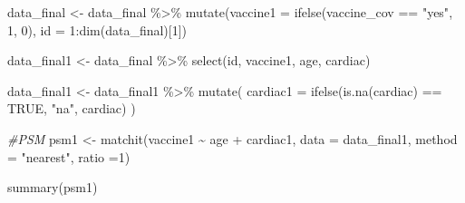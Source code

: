 \documentclass[
]{article}
\newenvironment{Shaded}{\begin{snugshade}}{\end{snugshade}}
\newcommand{\AttributeTok}[1]{\textcolor[rgb]{0.77,0.63,0.00}{#1}}
\newcommand{\CommentTok}[1]{\textcolor[rgb]{0.56,0.35,0.01}{\textit{#1}}}
\newcommand{\ConstantTok}[1]{\textcolor[rgb]{0.00,0.00,0.00}{#1}}
\newcommand{\DecValTok}[1]{\textcolor[rgb]{0.00,0.00,0.81}{#1}}
\newcommand{\FunctionTok}[1]{\textcolor[rgb]{0.00,0.00,0.00}{#1}}
\newcommand{\NormalTok}[1]{#1}
\newcommand{\OtherTok}[1]{\textcolor[rgb]{0.56,0.35,0.01}{#1}}
\newcommand{\SpecialCharTok}[1]{\textcolor[rgb]{0.00,0.00,0.00}{#1}}
\newcommand{\StringTok}[1]{\textcolor[rgb]{0.31,0.60,0.02}{#1}}
\begin{document}
\begin{Shaded}
\begin{Highlighting}[]
\NormalTok{data\_final }\OtherTok{\textless{}{-}}\NormalTok{ data\_final }\SpecialCharTok{\%\textgreater{}\%} 
  \FunctionTok{mutate}\NormalTok{(}\AttributeTok{vaccine1 =} \FunctionTok{ifelse}\NormalTok{(vaccine\_cov }\SpecialCharTok{==} \StringTok{"yes"}\NormalTok{, }\DecValTok{1}\NormalTok{, }\DecValTok{0}\NormalTok{),}
         \AttributeTok{id =} \DecValTok{1}\SpecialCharTok{:}\FunctionTok{dim}\NormalTok{(data\_final)[}\DecValTok{1}\NormalTok{]) }

\NormalTok{data\_final1 }\OtherTok{\textless{}{-}}\NormalTok{ data\_final }\SpecialCharTok{\%\textgreater{}\%} 
  \FunctionTok{select}\NormalTok{(id, vaccine1, age, cardiac)}

\NormalTok{data\_final1 }\OtherTok{\textless{}{-}}\NormalTok{ data\_final1 }\SpecialCharTok{\%\textgreater{}\%} 
  \FunctionTok{mutate}\NormalTok{(}
    \AttributeTok{cardiac1 =} \FunctionTok{ifelse}\NormalTok{(}\FunctionTok{is.na}\NormalTok{(cardiac) }\SpecialCharTok{==} \ConstantTok{TRUE}\NormalTok{, }\StringTok{"na"}\NormalTok{, cardiac)}
\NormalTok{  )}
  
\CommentTok{\#PSM}
\NormalTok{psm1 }\OtherTok{\textless{}{-}} \FunctionTok{matchit}\NormalTok{(vaccine1 }\SpecialCharTok{\textasciitilde{}}\NormalTok{ age }\SpecialCharTok{+}\NormalTok{ cardiac1, }\AttributeTok{data =}\NormalTok{ data\_final1, }\AttributeTok{method =} \StringTok{"nearest"}\NormalTok{, }\AttributeTok{ratio =}\DecValTok{1}\NormalTok{)}

\FunctionTok{summary}\NormalTok{(psm1)}
\end{Highlighting}
\end{Shaded}
\end{document}
